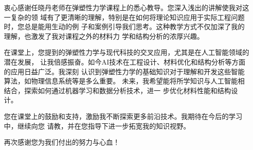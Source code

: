 衷心感谢任晓丹老师在弹塑性力学课程上的悉心教导。您深入浅出的讲解使我对这一复杂的领
域有了更清晰的理解，特别是在如何将理论知识应用于实际工程问题时，您总是能用生动的例
子和案例引导我们思考。这种教学方式不仅加深了我的理解，也激发了我对课程之外的材料力
学和结构分析的浓厚兴趣。

在课堂上，您提到的弹塑性力学与现代科技的交叉应用，尤其是在人工智能领域的潜在发展，
让我倍感振奋。如今AI技术在工程设计、材料优化和结构分析等方面的应用日益广泛。我深刻
认识到弹塑性力学的基础知识对于理解和开发这些智能算法，如物理信息系统等是多么重要。
未来，我希望能将所学知识与人工智能相结合，探索如何通过机器学习和数据分析技术，进一
步优化材料性能和结构设计。

您在课堂上的鼓励和支持，激励我不断探索更多前沿技术。我期待在今后的学习中，继续向您
请教，并在您指导下进一步拓宽我的知识视野。

再次感谢您为我们付出的努力与心血！